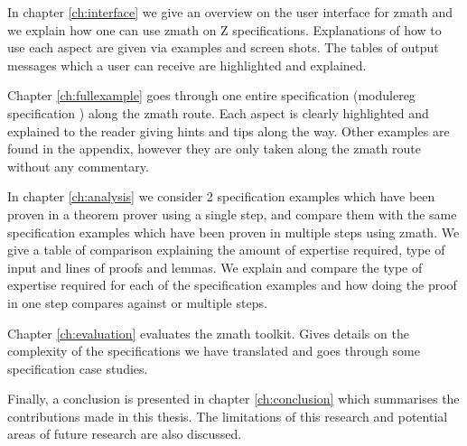 In chapter \ref{ch:interface} we give an overview on the user interface for
\gls{zmath} and we explain how one can use \gls{zmath} on Z specifications.
Explanations of how to use each aspect are given via examples and screen shots.
The tables of output messages which a user can receive are highlighted and
explained.

Chapter \ref{ch:fullexample} goes through one entire specification (modulereg
specification \cite{essenceofz}) along the \gls{zmath} route. Each aspect is
clearly highlighted and explained to the reader giving hints and tips along the
way. Other examples are found in the appendix, however they are only taken along
the \gls{zmath} route without any commentary.

In chapter \ref{ch:analysis} we consider 2 specification examples which have
been proven in a theorem prover using a single step, and compare them with the
same specification examples which have been proven in multiple steps using
\gls{zmath}. We give a table of comparison explaining the amount of expertise
required, type of input and lines of proofs and lemmas. We explain and compare
the type of expertise required for each of the specification examples and how
doing the proof in one step compares against or multiple steps.

Chapter \ref{ch:evaluation} evaluates the \gls{zmath} toolkit. Gives details on
the complexity of the specifications we have translated and goes through some
specification case studies.

Finally, a conclusion is presented in chapter \ref{ch:conclusion} which
summarises the contributions made in this thesis. The limitations of this
research and potential areas of future research are also discussed.
